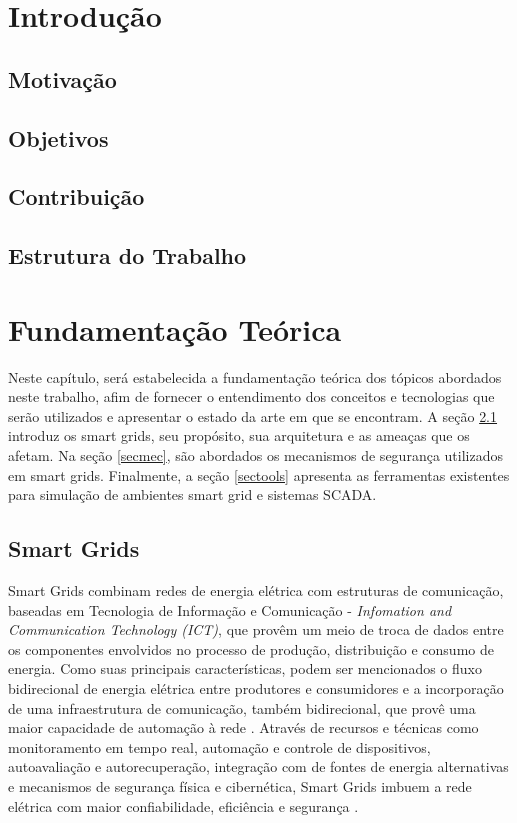 \documentclass[cic,tc]{iiufrgs}
\begin{document}
\chapter{Introdução}
\section{Motivação}
\section{Objetivos}
\section{Contribuição}
\section{Estrutura do Trabalho}
\chapter{Fundamentação Teórica}
Neste capítulo, será estabelecida a fundamentação teórica dos tópicos abordados neste trabalho, afim de fornecer o entendimento dos conceitos e tecnologias que serão utilizados e apresentar o estado da arte em que se encontram. A seção \ref{secsg} introduz os smart grids, seu propósito, sua arquitetura e as ameaças que os afetam. Na seção \ref{secmec}, são abordados os mecanismos de segurança utilizados em smart grids. Finalmente, a seção \ref{sectools} apresenta as ferramentas existentes para simulação de ambientes smart grid e sistemas SCADA.

\section{Smart Grids}
\label{secsg}
Smart Grids combinam redes de energia elétrica com estruturas de comunicação, baseadas em Tecnologia de Informação e Comunicação - \emph{Infomation and Communication Technology (ICT)}, que provêm um meio de troca de dados entre os componentes envolvidos no processo de produção, distribuição e consumo de energia. Como suas principais características, podem ser mencionados o fluxo bidirecional de energia elétrica entre produtores e consumidores e a incorporação de uma infraestrutura de comunicação, também bidirecional, que provê uma maior capacidade de automação à rede \cite{2013survey}. Através de recursos e técnicas como monitoramento em tempo real, automação e controle de dispositivos, autoavaliação e autorecuperação, integração com de fontes de energia alternativas e mecanismos de segurança física e cibernética, Smart Grids imbuem a rede elétrica com maior confiabilidade, eficiência e segurança \cite{li2012securing}.
\end{document}
